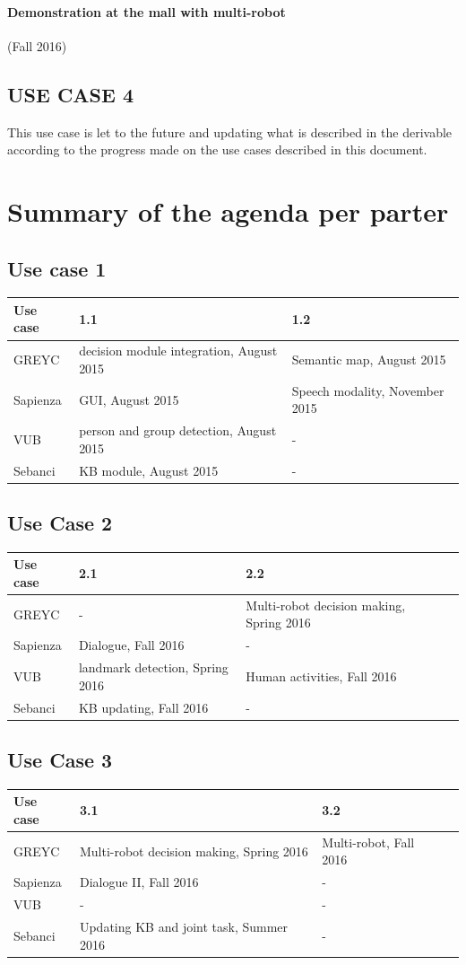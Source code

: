 \documentclass{article}
\begin{document}
\paragraph{\bf Demonstration at the mall with multi-robot} (Fall 2016)
\subsection{USE CASE 4}
 This use case is let to the future and updating what is described in the  derivable according to the progress made on the use cases described in this document.  
 \section{Summary of the agenda per parter}
 \subsection {Use case 1}
    \begin{tabular}{|l|l|l|}
   \hline
   Use case&1.1 & 1.2 \\
   \hline
   GREYC& decision module integration, August 2015&Semantic map, August 2015\\ \hline 
   Sapienza& GUI, August 2015&Speech modality, November 2015\\ \hline
   VUB & person and group detection, August 2015&-\\ \hline
   Sebanci& KB module, August 2015&- \\
   \hline
\end{tabular}
\subsection {Use Case 2}
 \begin{tabular}{|l|l|l|l}
   \hline
   Use case& 2.1 & 2.2   \\
   \hline
   GREYC& -&Multi-robot decision making, Spring 2016\\ \hline 
   Sapienza& Dialogue, Fall 2016&-\\ \hline
   VUB & landmark detection, Spring 2016& Human activities, Fall 2016 \\ \hline
   Sebanci& KB updating, Fall 2016&- \\
   \hline
\end{tabular}
\subsection{Use Case 3}
 \begin{tabular}{|l|l|l|l}
   \hline
   Use case& 3.1 & 3.2 \\
   \hline
   GREYC& Multi-robot decision making, Spring 2016& Multi-robot, Fall 2016\\ \hline 
   Sapienza& Dialogue II, Fall 2016&-\\ \hline
   VUB &-&-\\ \hline
   Sebanci&Updating KB and joint task, Summer 2016&- \\
   \hline
\end{tabular}
\end{document}
